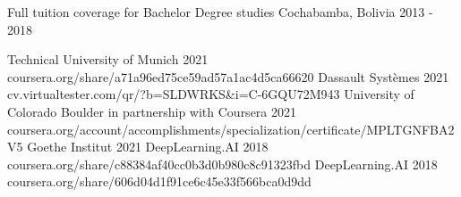 

\begin{cvhonors}
  {Full tuition coverage for Bachelor Degree studies}
  {Cochabamba, Bolivia}
  {2013 - 2018}
  {}
\end{cvhonors}

\begin{cvcertificates}
    {Technical University of Munich}
    {2021}
    {coursera.org/share/a71a96ed75ce59ad57a1ac4d5ca66620}
    {Dassault Syst\`emes}
    {2021}
    {cv.virtualtester.com/qr/?b=SLDWRKS\&i=C-6GQU72M943}
    {University of Colorado Boulder in partnership with Coursera}
    {2021}
    {coursera.org/account/accomplishments/specialization/certificate/MPLTGNFBA2V5}
    {Goethe Institut}
    {2021}
    {}
    {DeepLearning.AI}
    {2018}
    {coursera.org/share/c88384af40cc0b3d0b980c8c91323fbd}
    {DeepLearning.AI}
    {2018}
    {coursera.org/share/606d04d1f91ce6c45e33f566bca0d9dd}
\end{cvcertificates}
